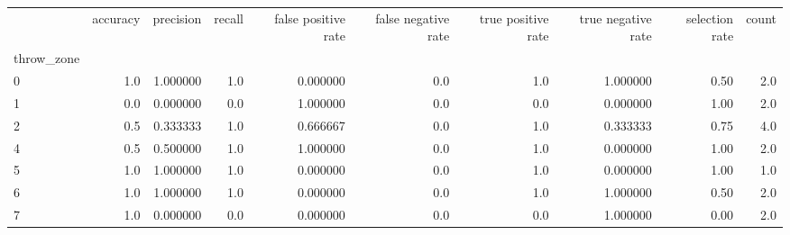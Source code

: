 \begin{tabular}{lrrrrrrrrr}
\toprule
{} &  accuracy &  precision &  recall &  false positive rate &  false negative rate &  true positive rate &  true negative rate &  selection rate &  count \\
throw\_zone &           &            &         &                      &                      &                     &                     &                 &        \\
\midrule
0          &       1.0 &   1.000000 &     1.0 &             0.000000 &                  0.0 &                 1.0 &            1.000000 &            0.50 &    2.0 \\
1          &       0.0 &   0.000000 &     0.0 &             1.000000 &                  0.0 &                 0.0 &            0.000000 &            1.00 &    2.0 \\
2          &       0.5 &   0.333333 &     1.0 &             0.666667 &                  0.0 &                 1.0 &            0.333333 &            0.75 &    4.0 \\
4          &       0.5 &   0.500000 &     1.0 &             1.000000 &                  0.0 &                 1.0 &            0.000000 &            1.00 &    2.0 \\
5          &       1.0 &   1.000000 &     1.0 &             0.000000 &                  0.0 &                 1.0 &            0.000000 &            1.00 &    1.0 \\
6          &       1.0 &   1.000000 &     1.0 &             0.000000 &                  0.0 &                 1.0 &            1.000000 &            0.50 &    2.0 \\
7          &       1.0 &   0.000000 &     0.0 &             0.000000 &                  0.0 &                 0.0 &            1.000000 &            0.00 &    2.0 \\
\bottomrule
\end{tabular}

